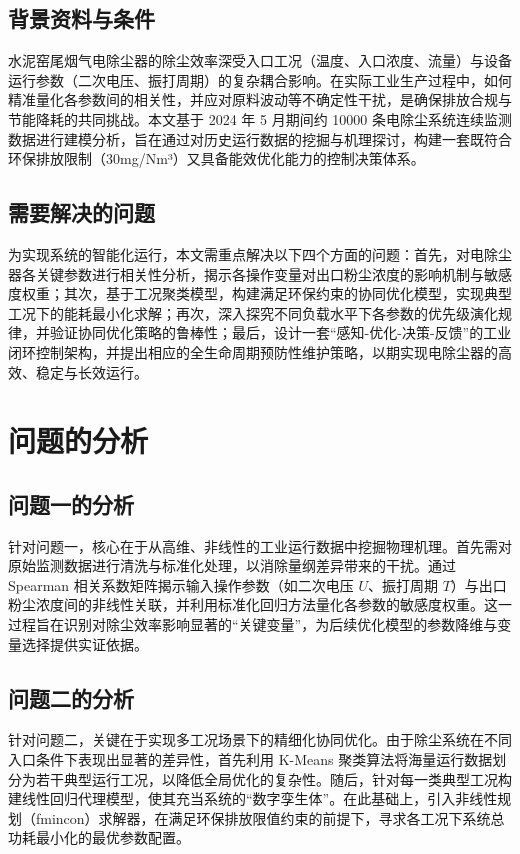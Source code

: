 \documentclass[UTF8, a4paper]{ctexart}
\begin{document}
\subsection{背景资料与条件}

水泥窑尾烟气电除尘器的除尘效率深受入口工况（温度、入口浓度、流量）与设备运行参数（二次电压、振打周期）的复杂耦合影响。在实际工业生产过程中，如何精准量化各参数间的相关性，并应对原料波动等不确定性干扰，是确保排放合规与节能降耗的共同挑战。本文基于 2024 年 5 月期间约 10000 条电除尘系统连续监测数据进行建模分析，旨在通过对历史运行数据的挖掘与机理探讨，构建一套既符合环保排放限制（30mg/Nm³）又具备能效优化能力的控制决策体系。

\subsection{需要解决的问题}

为实现系统的智能化运行，本文需重点解决以下四个方面的问题：首先，对电除尘器各关键参数进行相关性分析，揭示各操作变量对出口粉尘浓度的影响机制与敏感度权重；其次，基于工况聚类模型，构建满足环保约束的协同优化模型，实现典型工况下的能耗最小化求解；再次，深入探究不同负载水平下各参数的优先级演化规律，并验证协同优化策略的鲁棒性；最后，设计一套“感知-优化-决策-反馈”的工业闭环控制架构，并提出相应的全生命周期预防性维护策略，以期实现电除尘器的高效、稳定与长效运行。


\section{问题的分析}
\subsection{问题一的分析}
针对问题一，核心在于从高维、非线性的工业运行数据中挖掘物理机理。首先需对原始监测数据进行清洗与标准化处理，以消除量纲差异带来的干扰。通过 Spearman 相关系数矩阵揭示输入操作参数（如二次电压 $U$、振打周期 $T$）与出口粉尘浓度间的非线性关联，并利用标准化回归方法量化各参数的敏感度权重。这一过程旨在识别对除尘效率影响显著的“关键变量”，为后续优化模型的参数降维与变量选择提供实证依据。
\subsection{问题二的分析}
针对问题二，关键在于实现多工况场景下的精细化协同优化。由于除尘系统在不同入口条件下表现出显著的差异性，首先利用 K-Means 聚类算法将海量运行数据划分为若干典型运行工况，以降低全局优化的复杂性。随后，针对每一类典型工况构建线性回归代理模型，使其充当系统的“数字孪生体”。在此基础上，引入非线性规划（fmincon）求解器，在满足环保排放限值约束的前提下，寻求各工况下系统总功耗最小化的最优参数配置。
\end{document}
